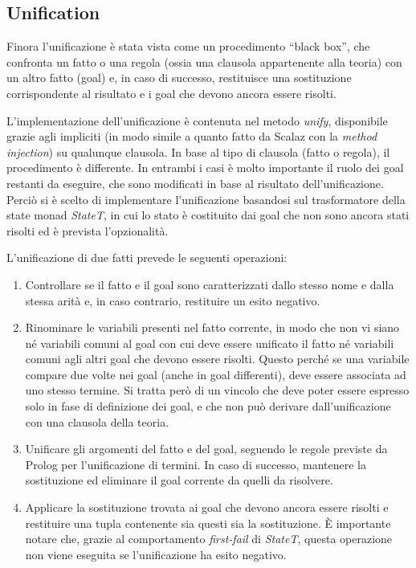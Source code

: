 \subsection{Unification}

Finora l'unificazione è stata vista come un procedimento ``black box'', che confronta un fatto o una regola (ossia una clausola appartenente alla teoria) con un altro fatto (goal) e, in caso di successo, restituisce una sostituzione corrispondente al risultato e i goal che devono ancora essere risolti.

L'implementazione dell'unificazione è contenuta nel metodo \textit{unify}, disponibile grazie agli impliciti (in modo simile a quanto fatto da Scalaz con la \textit{method injection}) su qualunque clausola. In base al tipo di clausola (fatto o regola), il procedimento è differente. In entrambi i casi è molto importante il ruolo dei goal restanti da eseguire, che sono modificati in base al risultato dell'unificazione. Perciò si è scelto di implementare l'unificazione basandosi sul trasformatore della state monad \textit{StateT}, in cui lo stato è costituito dai goal che non sono ancora stati risolti ed è prevista l'opzionalità.

L'unificazione di due fatti prevede le seguenti operazioni:

\begin{enumerate}
\item Controllare se il fatto e il goal sono caratterizzati dallo stesso nome e dalla stessa arità e, in caso contrario, restituire un esito negativo.
\item Rinominare le variabili presenti nel fatto corrente, in modo che non vi siano né variabili comuni al goal con cui deve essere unificato il fatto né variabili comuni agli altri goal che devono essere risolti. Questo perché se una variabile compare due volte nei goal (anche in goal differenti), deve essere associata ad uno stesso termine. Si tratta però di un vincolo che deve poter essere espresso solo in fase di definizione dei goal, e che non può derivare dall'unificazione con una clausola della teoria.
\item Unificare gli argomenti del fatto e del goal, seguendo le regole previste da Prolog per l'unificazione di termini. In caso di successo, mantenere la sostituzione ed eliminare il goal corrente da quelli da risolvere.
\item Applicare la sostituzione trovata ai goal che devono ancora essere risolti e restituire una tupla contenente sia questi sia la sostituzione. È importante notare che, grazie al comportamento \textit{first-fail} di \textit{StateT}, questa operazione non viene eseguita se l'unificazione ha esito negativo.
\end{enumerate}

